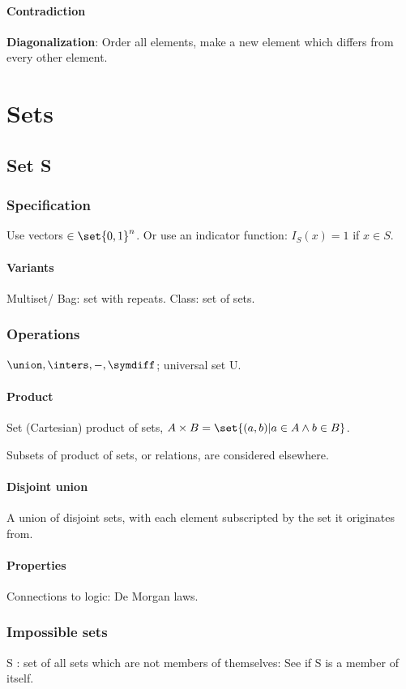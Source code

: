 \documentclass[oneside, article]{memoir}
\begin{document}
\subsection{Contradiction}
\textbf{Diagonalization}: Order all elements, make a new element which differs from every other element.


\part{Sets}

\chapter{Set S}
\section{Specification}
Use vectors $\in \set{0,1}^{n}$. Or use an indicator function: $I_{S}(x) = 1$ if $x \in S$.

\subsection{Variants}
Multiset/ Bag: set with repeats. Class: set of sets.

\section{Operations}
$\union, \inters, -, \symdiff$; universal set U.

\subsection{Product}
Set (Cartesian) product of sets, $A \times B = \set{(a, b)| a \in A \land b \in B}$.

Subsets of product of sets, or relations, are considered elsewhere.

\subsection{Disjoint union}
A union of disjoint sets, with each element subscripted by the set it originates from.

\subsection{Properties}
Connections to logic: De Morgan laws.

\section{Impossible sets}
S : set of all sets which are not members of themselves: See if S is a member of itself.
\end{document}
